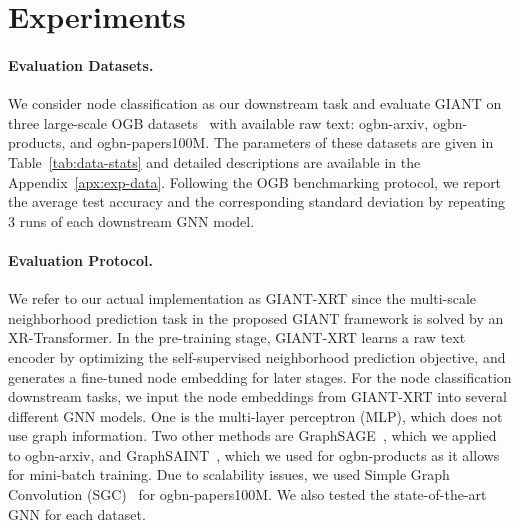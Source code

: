 \documentclass{article} \usepackage{iclr2022_conference,times}
\begin{document}
\vspace{-0.3cm}
\section{Experiments}\label{sec:exp}

\begin{table}[t!]
\caption{Basic statistics of the OGB benchmark datasets~\citep{hu2020open}.}
\vspace{0.1cm}
\label{tab:data-stats}
\centering
{}
\vspace{-0.15in}
\end{table}

\paragraph{Evaluation Datasets.}
We consider node classification as our downstream task and evaluate GIANT on three large-scale OGB datasets~\citep{hu2020open} with available raw text: ogbn-arxiv, ogbn-products, and ogbn-papers100M. The parameters of these datasets are given in Table~\ref{tab:data-stats} and detailed descriptions are available in the Appendix~\ref{apx:exp-data}. Following the OGB benchmarking protocol, we report the average test accuracy and the corresponding standard deviation by repeating 3 runs of each downstream GNN model.

\paragraph{Evaluation Protocol.}
We refer to our actual implementation as GIANT-XRT since the multi-scale neighborhood prediction task in the proposed GIANT framework is solved by an XR-Transformer. In the pre-training stage, GIANT-XRT learns a raw text encoder by optimizing the self-supervised neighborhood prediction objective, and generates a fine-tuned node embedding for later stages.
For the node classification downstream tasks, we input the node embeddings from GIANT-XRT into several different GNN models. One is the multi-layer perceptron (MLP), which does not use graph information. Two other methods are GraphSAGE~\citep{hamilton2017inductive}, which we applied to ogbn-arxiv, and GraphSAINT~\citep{graphsaint-iclr20}, which we used for ogbn-products as it allows for mini-batch training. Due to scalability issues, we used Simple Graph Convolution (SGC)~\citep{wu2019simplifying} for ogbn-papers100M. We also tested the state-of-the-art GNN for each dataset.
\end{document}
